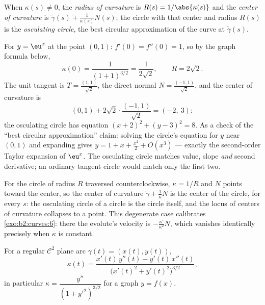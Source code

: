 \begin{definition}\label{def:b2:curves:curvature}
When $\kappa(s) \neq 0$, the \emph{radius of curvature} is $R(s) =
1/\abs{\kappa(s)}$ and the \emph{center of curvature} is
$\tilde\gamma(s) + \frac{1}{\kappa(s)} N(s)$; the circle with that
center and radius $R(s)$ is the \emph{osculating circle}, the
best circular approximation of the curve at $\tilde\gamma(s)$.
\end{definition}

\begin{example}\label{ex:b2:curves:oscexp}
For $y = \eu^x$ at the point $(0, 1)$: $f'(0) = f''(0) = 1$,
so by the graph formula below,
\[
\kappa(0) = \frac{1}{(1 + 1)^{3/2}} = \frac1{2\sqrt2},
\qquad R = 2\sqrt2 .
\]
The unit tangent is $T = \frac{(1, 1)}{\sqrt2}$, the direct
normal $N = \frac{(-1, 1)}{\sqrt2}$, and the center of
curvature is
\[
(0, 1) + 2\sqrt2\cdot\frac{(-1, 1)}{\sqrt2} = (-2,\ 3) :
\]
the osculating circle has equation $(x + 2)^2 + (y - 3)^2 =
8$. As a check of the ``best circular approximation'' claim:
solving the circle's equation for $y$ near $(0,1)$ and
expanding gives $y = 1 + x + \frac{x^2}2 + O(x^3)$ ---
exactly the second-order Taylor expansion of $\eu^x$. The
osculating circle matches value, slope \emph{and} second
derivative; an ordinary tangent circle would match only the
first two.
\end{example}

\begin{example}\label{ex:b2:curves:circleevolute}
For the circle of radius $R$ traversed counterclockwise,
$\kappa = 1/R$ and $N$ points toward the center, so the
center of curvature $\tilde\gamma + \frac1\kappa N$ is the
center of the circle, for every $s$: the osculating circle
of a circle is the circle itself, and the locus of centers
of curvature collapses to a point. This degenerate case
calibrates \cref{exo:b2:curves:6}: there the evolute's
velocity is $-\frac{\kappa'}{\kappa^2}N$, which vanishes
identically precisely when $\kappa$ is constant.
\end{example}

\begin{proposition}\label{prop:b2:curves:kappaformula}
For a regular $\mathcal{C}^2$ plane arc $\gamma(t) = (x(t), y(t))$,
\[
\kappa(t)
= \frac{x'(t)\,y''(t) - y'(t)\,x''(t)}
       {\bigl(x'(t)^2 + y'(t)^2\bigr)^{3/2}} ,
\]
in particular $\kappa = \dfrac{y''}{(1 + y'^2)^{3/2}}$ for a graph
$y = f(x)$.
\end{proposition}

